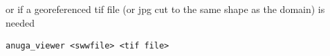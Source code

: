 \documentclass{manual}
\begin{document}
or if a georeferenced tif file (or jpg cut to the same shape as the domain) is needed

\begin{verbatim} 
anuga_viewer <swwfile> <tif file>
\end{verbatim} 








\end{document}
